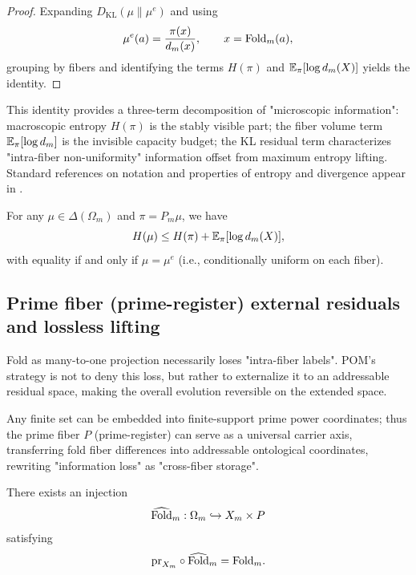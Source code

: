 \begin{proof}
Expanding $D_{\mathrm{KL}}(\mu\|\mu^e)$ and using
$$
\mu^e(a)=\frac{\pi(x)}{d_m(x)},\qquad x=\mathrm{Fold}_m(a),
$$
grouping by fibers and identifying the terms $H(\pi)$ and $\mathbb{E}_\pi[\log d_m(X)]$ yields the identity.\par
\end{proof}

This identity provides a three-term decomposition of "microscopic information": macroscopic entropy $H(\pi)$ is the stably visible part; the fiber volume term $\mathbb{E}_\pi[\log d_m]$ is the invisible capacity budget; the KL residual term characterizes "intra-fiber non-uniformity" information offset from maximum entropy lifting. Standard references on notation and properties of entropy and divergence appear in \cite{CoverThomas2006}.\par

\begin{corollary}\label{cor:maxent}
For any $\mu\in\Delta(\Omega_m)$ and $\pi=P_m\mu$, we have
$$
H(\mu)\le H(\pi)+\mathbb{E}_\pi[\log d_m(X)],
$$
with equality if and only if $\mu=\mu^e$ (i.e., conditionally uniform on each fiber).\par
\end{corollary}

\subsection{Prime fiber (prime-register) external residuals and lossless lifting}
Fold as many-to-one projection necessarily loses "intra-fiber labels". POM's strategy is not to deny this loss, but rather to externalize it to an addressable residual space, making the overall evolution reversible on the extended space.\par

\begin{definition}\label{def:prime-residual}
Any finite set can be embedded into finite-support prime power coordinates; thus the prime fiber $P$ (prime-register) can serve as a universal carrier axis, transferring fold fiber differences into addressable ontological coordinates, rewriting "information loss" as "cross-fiber storage".\par
\end{definition}

\begin{proposition}\label{prop:lossless-uplift}
There exists an injection
$$
\widehat{\mathrm{Fold}}_m:\Omega_m\hookrightarrow X_m\times P
$$
satisfying
$$
\mathrm{pr}_{X_m}\circ\widehat{\mathrm{Fold}}_m = \mathrm{Fold}_m.
$$
\end{proposition}

